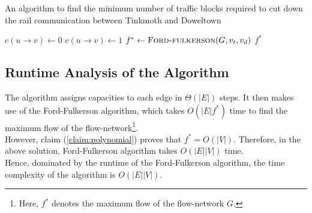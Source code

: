 \documentclass[12pt]{report}
\begin{document}
    \begin{algorithm}[H]
        \caption{An algorithm to find the minimum number of traffic blocks required to cut down the rail communication between Tinkmoth and Doweltown}
        \label{alg:min-traffic-blocks}
        \begin{algorithmic}[1]
                    \State $c(u \to v) \gets 0$
                \Else
                    \State $c(u \to v) \gets 1$
                \EndIf
            \EndFor
            \State $f^{*} \gets \Call{Ford-fulkerson}{G, v_{t}, v_{d}}$
            \State \Return $f^{*}$
            \EndProcedure
        \end{algorithmic}
    \end{algorithm}

    \subsection*{Runtime Analysis of the Algorithm}
    The algorithm assigns capacities to each edge in $\Theta(|E|)$ steps.
    It then makes use of the Ford-Fulkerson algorithm, which takes $O(|E| f^{*})$ time to find the maximum flow of the flow-network\footnote{
        Here, $f^{*}$ denotes the maximum flow of the flow-network $G$.
    }. \\
    However, claim (\ref{claim:polynomial}) proves that $f^{*} = O(|V|)$.
    Therefore, in the above solution, Ford-Fulkerson algorithm takes $O(|E||V|)$ time.
    \vspace*{10pt} \\
    Hence, dominated by the runtime of the Ford-Fulkerson algorithm, the time complexity of the algorithm is $O(|E||V|)$.
    \vfill
\end{document}
